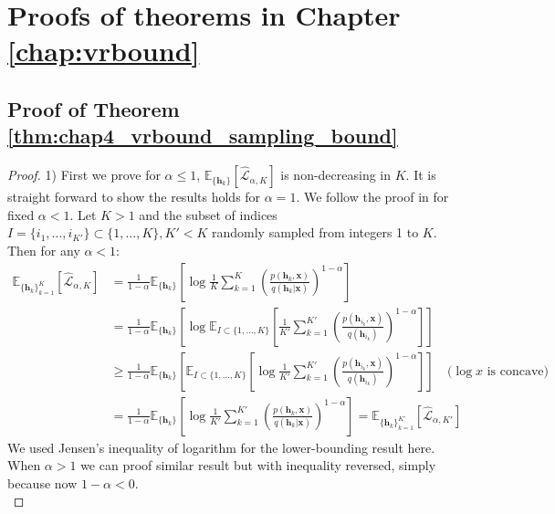 \section{Proofs of theorems in Chapter \ref{chap:vrbound}}
\label{sec:appendix_proof_chap4}

\subsection{Proof of Theorem \ref{thm:chap4_vrbound_sampling_bound}}

\begin{proof}
 1) First we prove for $\alpha \leq 1$, $\mathbb{E}_{\{ \bm{h}_k \} }[\hat{\mathcal{L}}_{\alpha, K}]$ is non-decreasing in $K$. It is straight forward to show the results holds for $\alpha=1$. We follow the proof in \cite{burda:iwae2016} for fixed $\alpha < 1$. Let $K > 1$ and the subset of indices $I = \{i_1, ..., i_{K'} \} \subset \{1, ..., K\}, K' < K$ randomly sampled from integers 1 to $K$. Then for any $\alpha < 1$:
 \begin{equation*}
 \begin{aligned}
  \mathbb{E}_{\{ \bm{h}_k \}_{k=1}^K }[\hat{\mathcal{L}}_{\alpha, K}] 
  &= \frac{1}{1 - \alpha} \mathbb{E}_{\{ \bm{h}_k \}} \left[ \log \frac{1}{K} \sum_{k=1}^K \left( \frac{p(\bm{h}_k, \bm{x})}{q(\bm{h}_k|\bm{x})}  \right)^{1 - \alpha} \right] \\
  &= \frac{1}{1 - \alpha} \mathbb{E}_{\{ \bm{h}_k \}} \left[ \log \mathbb{E}_{I \subset \{1, ..., K\}} \left[ \frac{1}{K'} \sum_{k=1}^{K'} \left( \frac{p(\bm{h}_{i_k}, \bm{x})}{q(\bm{h}_{i_k})}  \right)^{1 - \alpha} \right] \right] \\
  &\geq \frac{1}{1 - \alpha} \mathbb{E}_{\{ \bm{h}_k \}} \left[ \mathbb{E}_{I \subset \{1, ..., K\}} \left[ \log \frac{1}{K'} \sum_{k=1}^{K'} \left( \frac{p(\bm{h}_{i_k}, \bm{x})}{q(\bm{h}_{i_k})}  \right)^{1 - \alpha} \right] \right] \quad \text{($\log x$ is concave)}\\
  &= \frac{1}{1 - \alpha} \mathbb{E}_{\{ \bm{h}_k \}} \left[ \log \frac{1}{K'} \sum_{k=1}^{K'} \left( \frac{p(\bm{h}_k, \bm{x})}{q(\bm{h}_k|\bm{x})}  \right)^{1 - \alpha} \right] 
  = \mathbb{E}_{\{ \bm{h}_k \}_{k=1}^{K'} }[\hat{\mathcal{L}}_{\alpha, K'}] 
 \end{aligned}
 \end{equation*}
We used Jensen's inequality of logarithm for the lower-bounding result here. When $\alpha > 1$ we can proof similar result but with inequality reversed, simply because now $1 - \alpha < 0$. \\


\end{proof}

